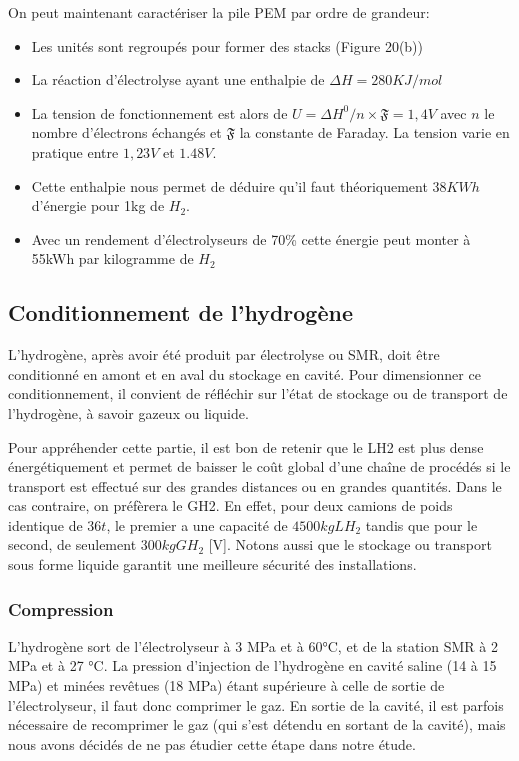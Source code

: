 \documentclass[11pt,french,a4paper]{article}
\begin{document}
On peut maintenant caractériser la pile PEM par ordre de grandeur:\\
\begin{itemize}
\item Les unités sont regroupés pour former des stacks (Figure 20(b))
\item La réaction d’électrolyse ayant une enthalpie de $\Delta H = 280 KJ/mol$
\item La tension de fonctionnement est alors de $U= \Delta H^0 /n\times \mathfrak{F} =1,4 V$ avec $n$ le nombre d’électrons échangés et $\mathfrak{F}$ la constante de Faraday. La tension varie en pratique entre $1,23V$ et $1.48V$. 
\item Cette enthalpie nous permet de déduire qu’il faut théoriquement $38KWh$ d'énergie pour 1kg de $H_2$.
\item Avec un rendement d’électrolyseurs de 70\% cette énergie peut monter à 55kWh par kilogramme de $H_2$
\end{itemize}

\subsection{Conditionnement de l'hydrogène}

L’hydrogène, après avoir été produit par électrolyse ou SMR, doit être conditionné en amont et en aval du stockage en cavité. Pour dimensionner ce conditionnement, il convient de réfléchir sur l’état de stockage ou de transport de l’hydrogène, à savoir gazeux ou liquide.

Pour appréhender cette partie, il est bon de retenir que le LH2 est plus dense énergétiquement et permet de baisser le coût global d'une chaîne de procédés si le transport est effectué sur des grandes distances ou en grandes quantités. Dans le cas contraire, on préfèrera le GH2. En effet, pour deux camions de poids identique de $36t$, le premier a une capacité de $4500 kg LH_2$ tandis que pour le second, de seulement $300 kg GH_2$ [V]. Notons aussi que le stockage ou transport sous forme liquide garantit une meilleure sécurité des installations.

\subsubsection{Compression}

L'hydrogène sort de l'électrolyseur à 3 MPa et à 60°C, et de la station SMR à 2 MPa et à 27 °C. La pression d'injection de l'hydrogène en cavité saline (14 à 15 MPa) et minées revêtues (18 MPa) étant supérieure à celle de sortie de l'électrolyseur, il faut donc comprimer le gaz. En sortie de la cavité, il est parfois nécessaire de recomprimer le gaz (qui s’est détendu en sortant de la cavité), mais nous avons décidés de ne pas étudier cette étape dans notre étude. 
\end{document}
